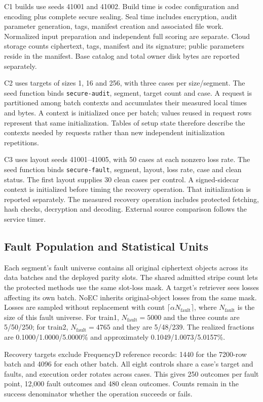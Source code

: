 \documentclass[10pt,journal,onecolumn]{IEEEtran}
\begin{document}
C1 builds use seeds 41001 and 41002. Build time is codec configuration and
encoding plus complete secure sealing. Seal time includes encryption, audit
parameter generation, tags, manifest creation and associated file work.
Normalized input preparation and independent full scoring are separate.
Cloud storage counts ciphertext, tags, manifest and its signature; public
parameters reside in the manifest. Base catalog and total owner disk bytes
are reported separately.

C2 uses targets of sizes 1, 16 and 256, with three cases per size/segment.
The seed function binds \texttt{secure-audit}, segment, target count and case.
A request is partitioned among batch contexts and accumulates their measured
local times and bytes. A context is initialized once per batch; values
reused in request rows represent that same initialization. Tables of setup
state therefore describe the contexts needed by requests rather than new
independent initialization repetitions.

C3 uses layout seeds 41001--41005, with 50 cases at each nonzero loss rate.
The seed function binds \texttt{secure-fault}, segment, layout, loss rate,
case and clean status. The first layout supplies 30 clean cases per control.
A signed-sidecar context is initialized before timing the recovery operation.
That initialization is reported separately. The measured recovery operation
includes protected fetching, hash checks, decryption and decoding. External
source comparison follows the service timer.

\subsection{Fault Population and Statistical Units}
Each segment's fault universe contains all original ciphertext objects across
its data batches and the deployed parity slots. The shared admitted stripe
count lets the protected methods use the same slot-loss mask. A target's
retriever sees losses affecting its own batch. NoEC inherits original-object
losses from the same mask. Losses are sampled without replacement with count
$\lceil\alpha N_{\mathrm{fault}}\rceil$, where $N_{\mathrm{fault}}$ is the size
of this fault universe. For train1, $N_{\mathrm{fault}}=5000$ and the three
counts are 5/50/250; for train2, $N_{\mathrm{fault}}=4765$ and they are 5/48/239. The realized fractions
are 0.1000/1.0000/5.0000\% and approximately 0.1049/1.0073/5.0157\%.

Recovery targets exclude FrequencyD reference records: 1440 for the 7200-row
batch and 4096 for each other batch. All eight controls share a case's target
and faults, and execution order rotates across cases. This gives 250 outcomes
per fault point, 12,000 fault outcomes and 480 clean outcomes. Counts remain
in the success denominator whether the operation succeeds or fails.
\end{document}
